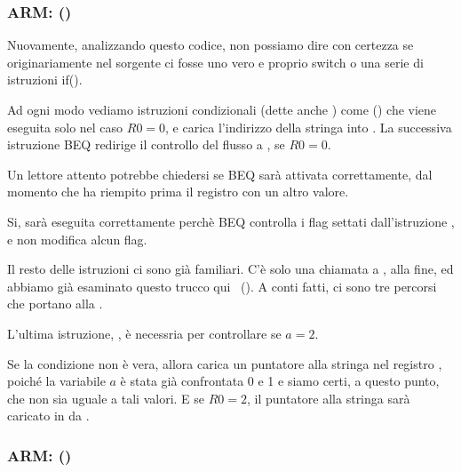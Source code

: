 \subsubsection{ARM: \OptimizingKeilVI (\ARMMode)}



Nuovamente, analizzando questo codice, non possiamo dire con certezza se originariamente nel sorgente ci fosse uno vero e proprio switch
o una serie di istruzioni if().


Ad ogni modo vediamo istruzioni condizionali (dette anche ) come \ADREQ ()
che viene eseguita solo nel caso $R0=0$, e carica l'indirizzo della stringa 
into .
La successiva istruzione \ac{BEQ} redirige il controllo del flusso a , se $R0=0$.

Un lettore attento potrebbe chiedersi se \ac{BEQ} sarà attivata correttamente, dal momento che \ADREQ
ha riempito prima il registro  con un altro valore.

Si, sarà eseguita correttamente perchè \ac{BEQ} controlla i flag settati dall'istruzione \CMP, 
e \ADREQ non modifica alcun flag.

Il resto delle istruzioni ci sono già familiari. C'è solo una chiamata a \printf, alla fine, ed abbiamo già esaminato
questo trucco qui ~().
A conti fatti, ci sono tre percorsi che portano alla \printf{}.

L'ultima istruzione, , è necessria per controllare se $a=2$.

Se la condizione non è vera, allora \ADRNE carica un puntatore alla stringa 
nel registro , poiché la variabile $a$ è stata già confrontata 0 e 1 e siamo certi, a questo punto, 
che non sia uguale a tali valori.
E se $R0=2$, il puntatore alla stringa  sarà caricato in  da \ADREQ.

\subsubsection{ARM: \OptimizingKeilVI (\ThumbMode)}



